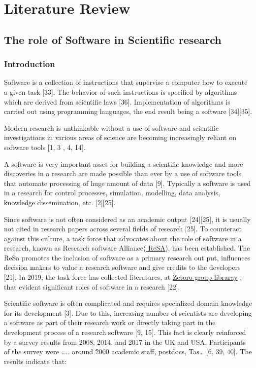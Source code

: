 \documentclass[12pt, a4paper]{article}
\begin{document}
\section{Literature Review }

\subsection{The role of Software in Scientific research}
\subsubsection{Introduction}
Software is a collection of instructions that supervise a computer how to execute a given task [33]. The behavior of such instructions is specified by algorithms which are derived from scientific laws [36].  Implementation of algorithms is carried out using programming languages, the end result being a software [34][35]. 

Modern research is unthinkable without a use of software and scientific investigations in various areas of science are becoming increasingly reliant on software tools [1, 3 , 4, 14]. 

A software is very important asset for building a scientific knowledge and more discoveries in a research are made possible than ever by a use of software tools that automate processing of huge amount of data [9]. Typically a software is used in a research for control processes, simulation, modelling, data analysis, knowledge dissemination, etc. [2][25].

Since software is not often considered as an academic output [24][25], it is usually not cited in research papers across several fields of research [25]. To counteract against this culture, a task force that advocates about the role of software in a research, known as Research software Alliance(\href{https://www.researchsoft.org/}{ ReSA}), has been established. The ReSa promotes the inclusion of software as a primary research out put, influences decision makers to value a research software and give credits to the developers [21]. In 2019, the task force has collected literatures, at \href{https://www.zotero.org/groups/2400609/resa/library}{Zetoro group libraray} , that evident significant roles of software in a research [22].  

Scientific software is often complicated and requires specialized domain knowledge for its development [3]. Due to this, increasing number of scientists are developing a software as part of their research work or directly taking part in the development process of a research software [9, 15]. This fact is clearly reinforced by a  survey results  from 2008, 2014, and 2017  in the UK and USA. Participants of the survey were ….. around 2000 academic staff, postdocs, Tas… [6, 39, 40].  The results indicate that:
\end{document}
